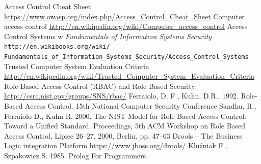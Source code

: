 \documentclass{classrep}
\begin{document}
\begin{thebibliography}{10}
Access Control Cheat Sheet \url{https://www.owasp.org/index.php/Access\_Control\_Cheat\_Sheet}
Computer access control \url{http://en.wikipedia.org/wiki/Computer\_access\_control}
Access Control Systems w \textsl{Fundamentals of Information Systems Security} \texttt{http://en.wikibooks.org/wiki/\\Fundamentals\_of\_Information\_Systems\_Security/Access\_Control\_Systems}
Trusted Computer System Evaluation Criteria \url{http://en.wikipedia.org/wiki/Trusted\_Computer\_System\_Evaluation\_Criteria}
Role Based Access Control (RBAC) and Role Based Security \url{http://csrc.nist.gov/groups/SNS/rbac/}
Ferraiolo, D. F., Kuhn, D.R., 1992. Role-Based Access Control. 15th National Computer Security Conference
Sandhu, R., Ferraiolo D., Kuhn R. 2000. The NIST Model for  Role Based Access Control:  Toward a Unified Standard. 
Proceedings, 5th ACM Workshop on Role Based Access Control, Lipiec 26--27, 2000, Berlin, pp. 47--63 
Drools -- The Business Logic integration Platform \url{https://www.jboss.org/drools/}
Kluźniak F., Szpakowicz S. 1985. Prolog For Programmers.
\end{thebibliography}
\end{document}
